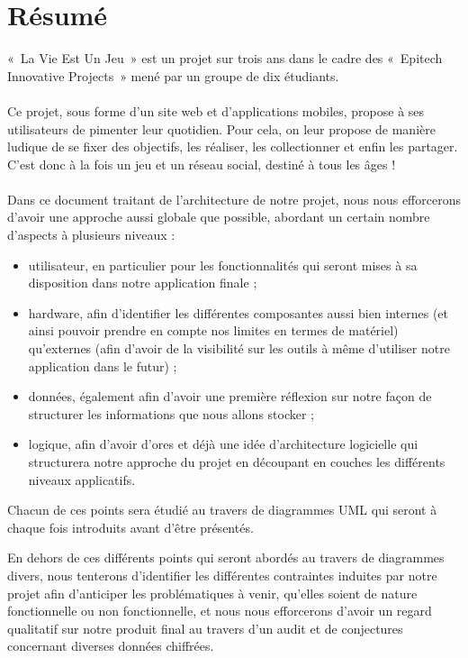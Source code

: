 \documentclass{life-fr}
\begin{document}
\chapter*{Résumé}
{
  «~La Vie Est Un Jeu~» est un projet sur trois ans dans le cadre des «~Epitech
  Innovative Projects~» mené par un groupe de dix étudiants.\\
  \\
  Ce projet, sous forme d'un site web et d'applications mobiles, propose à
  ses utilisateurs de pimenter leur quotidien. Pour cela, on leur propose
  de manière ludique de se fixer des objectifs, les réaliser, les collectionner
  et enfin les partager.\\
  C'est donc à la fois un jeu et un réseau social, destiné à tous les âges !\\
  \\
  Dans ce document traitant de l'architecture de notre projet, nous nous efforcerons d'avoir une approche aussi globale que possible, abordant un certain nombre d’aspects à plusieurs niveaux :

\begin{itemize}
      \item utilisateur,  en particulier pour les fonctionnalités qui seront mises à sa disposition dans notre application finale ;
      \item hardware, afin d'identifier les différentes composantes aussi bien internes (et ainsi pouvoir prendre en compte nos limites en termes de matériel) qu'externes (afin d'avoir de la visibilité sur les outils à même d'utiliser notre application dans le futur) ;
      \item données, également afin d'avoir une première réflexion sur notre façon de structurer les informations que nous allons stocker ;
      \item logique, afin d'avoir d'ores et déjà une idée d'architecture logicielle qui structurera notre approche du projet en découpant en couches les différents niveaux applicatifs.
\end{itemize}

Chacun de ces points sera étudié au travers de diagrammes UML qui seront à chaque fois introduits avant d'être présentés.

En dehors de ces différents points qui seront abordés au travers de diagrammes divers, nous tenterons d'identifier les différentes contraintes induites par notre projet afin d'anticiper les problématiques à venir, qu'elles soient de nature fonctionnelle ou non fonctionnelle, et nous nous efforcerons d'avoir un regard qualitatif sur notre produit final au travers d'un audit et de conjectures concernant diverses données chiffrées.

}
\end{document}

